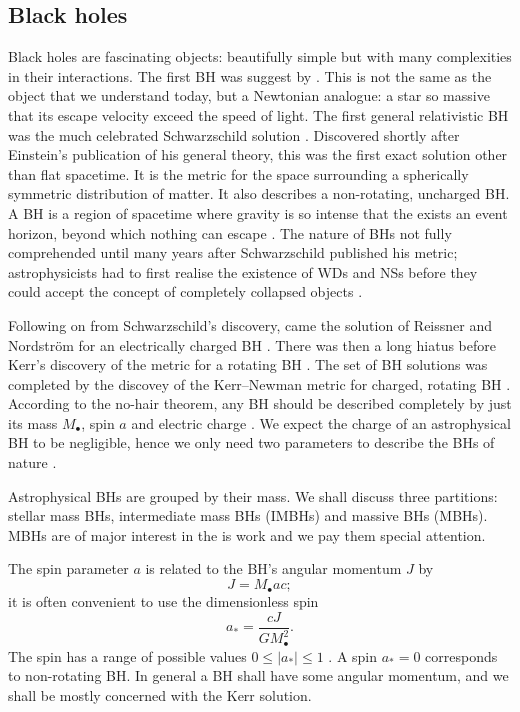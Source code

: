 \subsection{Black holes}

Black holes are fascinating objects: beautifully simple but with many complexities in their interactions. The first BH was suggest by \citet{Michell1784}. This is not the same as the object that we understand today, but a Newtonian analogue: a star so massive that its escape velocity exceed the speed of light. The first general relativistic BH was the much celebrated Schwarzschild solution \citep{Schwarzschild1916}. Discovered shortly after Einstein's publication of his general theory, this was the first exact solution other than flat spacetime. It is the metric for the space surrounding a spherically symmetric distribution of matter. It also describes a non-rotating, uncharged BH. A BH is a region of spacetime where gravity is so intense that the exists an event horizon, beyond which nothing can escape \citep[section 33.1]{Misner1973}. The nature of BHs not fully comprehended until many years after Schwarzschild published his metric; astrophysicists had to first realise the existence of WDs and NSs before they could accept the concept of completely collapsed objects \citep{Israel1987}.

Following on from Schwarzschild's discovery, came the solution of Reissner and Nordstr{\"o}m for an electrically charged BH \citep{Reissner1916,Nordstrom1918}. There was then a long hiatus before Kerr's discovery of the metric for a rotating BH \citep{Kerr1963}. The set of BH solutions was completed by the discovey of the Kerr--Newman metric for charged, rotating BH \citep{Newman1965}. According to the no-hair theorem, any BH should be described completely by just its mass $M_\bullet$, spin $a$ and electric charge \citep{Israel1967, Israel1968, Carter1971, Hawking1972, Robinson1975}. We expect the charge of an astrophysical BH to be negligible, hence we only need two parameters to describe the BHs of nature \citep[sections 36 and 51]{Chandrasekhar1992}.

Astrophysical BHs are grouped by their mass. We shall discuss three partitions: stellar mass BHs, intermediate mass BHs (IMBHs) and massive BHs (MBHs). MBHs are of major interest in the is work and we pay them special attention.

The spin parameter $a$ is related to the BH's angular momentum $J$ by
\begin{equation}
J = M_\bullet ac;
\end{equation}
it is often convenient to use the dimensionless spin
\begin{equation}
a_\ast = \frac{cJ}{GM_\bullet^2}.
\end{equation}
The spin has a range of possible values $0 \leq |a_\ast| \leq 1$ \cite[section 66]{Chandrasekhar1992}. A spin $a_\ast = 0$ corresponds to non-rotating BH. In general a BH shall have some angular momentum, and we shall be mostly concerned with the Kerr solution.

